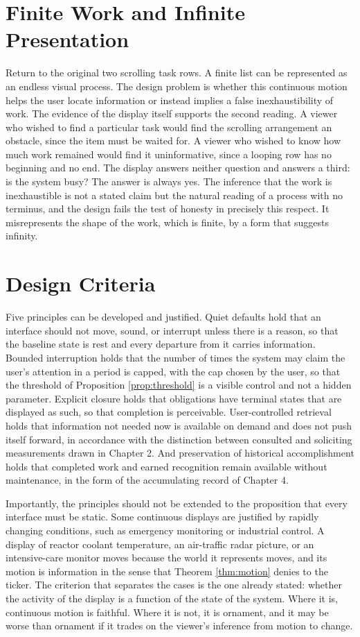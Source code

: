 \documentclass[11pt]{report}
\theoremstyle{definition}
\theoremstyle{remark}
\begin{document}
\section{Finite Work and Infinite Presentation}

Return to the original two scrolling task rows. A finite list can be represented as an endless visual process. The design problem is whether this continuous motion helps the user locate information or instead implies a false inexhaustibility of work. The evidence of the display itself supports the second reading. A viewer who wished to find a particular task would find the scrolling arrangement an obstacle, since the item must be waited for. A viewer who wished to know how much work remained would find it uninformative, since a looping row has no beginning and no end. The display answers neither question and answers a third: is the system busy? The answer is always yes. The inference that the work is inexhaustible is not a stated claim but the natural reading of a process with no terminus, and the design fails the test of honesty in precisely this respect. It misrepresents the shape of the work, which is finite, by a form that suggests infinity.

\section{Design Criteria}

Five principles can be developed and justified. Quiet defaults hold that an interface should not move, sound, or interrupt unless there is a reason, so that the baseline state is rest and every departure from it carries information. Bounded interruption holds that the number of times the system may claim the user's attention in a period is capped, with the cap chosen by the user, so that the threshold of Proposition \ref{prop:threshold} is a visible control and not a hidden parameter. Explicit closure holds that obligations have terminal states that are displayed as such, so that completion is perceivable. User-controlled retrieval holds that information not needed now is available on demand and does not push itself forward, in accordance with the distinction between consulted and soliciting measurements drawn in Chapter 2. And preservation of historical accomplishment holds that completed work and earned recognition remain available without maintenance, in the form of the accumulating record of Chapter 4.

Importantly, the principles should not be extended to the proposition that every interface must be static. Some continuous displays are justified by rapidly changing conditions, such as emergency monitoring or industrial control. A display of reactor coolant temperature, an air-traffic radar picture, or an intensive-care monitor moves because the world it represents moves, and its motion is information in the sense that Theorem \ref{thm:motion} denies to the ticker. The criterion that separates the cases is the one already stated: whether the activity of the display is a function of the state of the system. Where it is, continuous motion is faithful. Where it is not, it is ornament, and it may be worse than ornament if it trades on the viewer's inference from motion to change.
\end{document}
